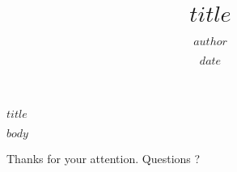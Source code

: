 \documentclass{beamer}
\title{$title$}
\author{$author$}
\institute{$institute$}
\date{$date$}
\begin{document}
\begin{frame}
    \titlepage
\end{frame}

\begin{frame}{$title$}
    \tableofcontents
\end{frame}

$body$

\begin{frame}
    \begin{center}
	Thanks for your attention. Questions ?
    \end{center}
\end{frame}
\end{document}
